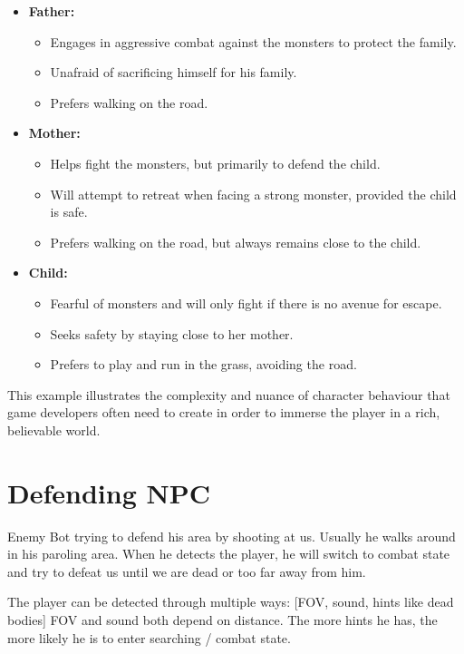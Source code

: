 \begin{itemize}
    \item \textbf{Father:}
    \begin{itemize}
        \item Engages in aggressive combat against the monsters to protect the family.
        \item Unafraid of sacrificing himself for his family.
        \item Prefers walking on the road.
    \end{itemize}

    \item \textbf{Mother:}
    \begin{itemize}
        \item Helps fight the monsters, but primarily to defend the child.
        \item Will attempt to retreat when facing a strong monster, provided the child is safe.
        \item Prefers walking on the road, but always remains close to the child.
    \end{itemize}

    \item \textbf{Child:}
    \begin{itemize}
        \item Fearful of monsters and will only fight if there is no avenue for escape.
        \item Seeks safety by staying close to her mother.
        \item Prefers to play and run in the grass, avoiding the road.
    \end{itemize}
\end{itemize}

This example illustrates the complexity and nuance of character behaviour that game developers often need to create in order to immerse the player in a rich, believable world.

\section{Defending NPC}

Enemy Bot trying to defend his area by shooting at us. Usually he walks around in his paroling area. When he detects the player, he will switch to combat state and try to defeat us until we are dead or too far away from him.

The player can be detected through multiple ways: [FOV, sound, hints like dead bodies]
FOV and sound both depend on distance.
The more hints he has, the more likely he is to enter searching / combat state.

